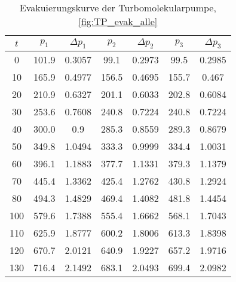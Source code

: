 \begin{table}[H]
    \centering
    \caption{Evakuierungskurve der Turbomolekularpumpe, \ref{fig:TP_evak_alle}}
    \label{tab:TP_evak_alle}
    \begin{tabular}{c c c c c c c}
        \toprule
        {$t$} & {$p_1$} & {$\Delta p_1$} & {$p_2$} & {$\Delta p_2$} & {$p_3$} & {$\Delta p_3$} \\
        \midrule
        0 & 101.9 & 0.3057 & 99.1 & 0.2973 & 99.5 & 0.2985     \\
        10 & 165.9 & 0.4977 & 156.5 & 0.4695 & 155.7 & 0.467   \\
        20 & 210.9 & 0.6327 & 201.1 & 0.6033 & 202.8 & 0.6084  \\
        30 & 253.6 & 0.7608 & 240.8 & 0.7224 & 240.8 & 0.7224  \\
        40 & 300.0 & 0.9 & 285.3 & 0.8559 & 289.3 & 0.8679     \\
        50 & 349.8 & 1.0494 & 333.3 & 0.9999 & 334.4 & 1.0031  \\
        60 & 396.1 & 1.1883 & 377.7 & 1.1331 & 379.3 & 1.1379  \\
        70 & 445.4 & 1.3362 & 425.4 & 1.2762 & 430.8 & 1.2924  \\
        80 & 494.3 & 1.4829 & 469.4 & 1.4082 & 481.8 & 1.4454  \\
        100 & 579.6 & 1.7388 & 555.4 & 1.6662 & 568.1 & 1.7043 \\
        110 & 625.9 & 1.8777 & 600.2 & 1.8006 & 613.3 & 1.8398 \\
        120 & 670.7 & 2.0121 & 640.9 & 1.9227 & 657.2 & 1.9716 \\
        130 & 716.4 & 2.1492 & 683.1 & 2.0493 & 699.4 & 2.0982 \\
        \bottomrule
    \end{tabular}
\end{table}

